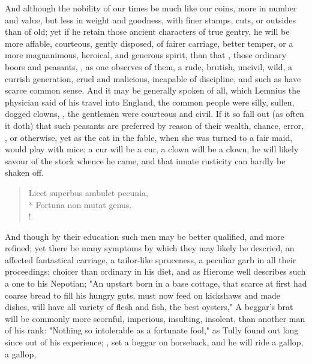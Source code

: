 {And although the nobility of our times be much like our coins, more in number and value, but less in weight and goodness, with finer stamps, cuts, or outsides than of old; yet if he retain those ancient characters of true gentry, he will be more affable, courteous, gently disposed, of fairer carriage, better temper, or a more magnanimous, heroical, and generous spirit, than that , those ordinary boors and peasants, , as one observes of them, a rude, brutish, uncivil, wild, a currish generation, cruel and malicious, incapable of discipline, and such as have scarce common sense. And it may be generally spoken of all, which Lemnius the physician said of his travel into England, the common people were silly, sullen, dogged clowns, , the gentlemen were courteous and civil. If it so fall out (as often it doth) that such peasants are preferred by reason of their wealth, chance, error, \etc{}, or otherwise, yet as the cat in the fable, when she was turned to a fair maid, would play with mice; a cur will be a cur, a clown will be a clown, he will likely savour of the stock whence he came, and that innate rusticity can hardly be shaken off.

\begin{latin}
\begin{verse}%
Licet superbus ambulet pecunia,\\*
Fortuna non mutat genus.\\!
\end{verse}%
\end{latin}
%

And though by their education such men may be better qualified, and more refined; yet there be many symptoms by which they may likely be descried, an affected fantastical carriage, a tailor-like spruceness, a peculiar garb in all their proceedings; choicer than ordinary in his diet, and as Hierome well describes such a one to his Nepotian; "An upstart born in a base cottage, that scarce at first had coarse bread to fill his hungry guts, must now feed on kickshaws and made dishes, will have all variety of flesh and fish, the best oysters," \etc{} A beggar's brat will be commonly more scornful, imperious, insulting, insolent, than another man of his rank: "Nothing so intolerable as a fortunate fool," as Tully found out long since out of his experience; , set a beggar on horseback, and he will ride a gallop, a gallop, \etc{}

}
